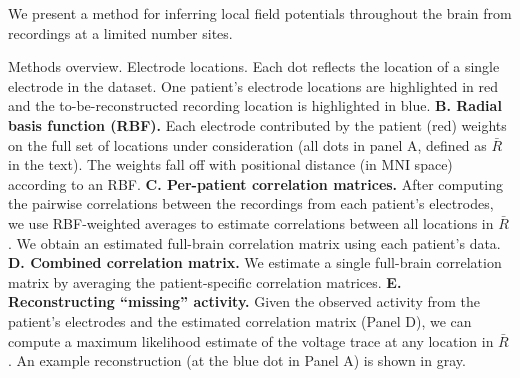 
We present a method for inferring local field potentials throughout the brain from recordings at a limited number sites.

Methods overview. Electrode
      locations.  Each dot reflects the location of a single
    electrode in the dataset.  One patient's electrode locations are
    highlighted in red and the to-be-reconstructed recording location
    is highlighted in blue. \textbf{B. Radial basis function (RBF).}
    Each electrode contributed by the patient (red) weights on the
    full set of locations under consideration (all dots in panel A,
    defined as $\bar{R}$ in the text).  The weights fall off with
    positional distance (in MNI space) according to an RBF.
    \textbf{C. Per-patient correlation matrices.}  After computing the
    pairwise correlations between the recordings from each patient's
    electrodes, we use RBF-weighted averages to estimate correlations
    between all locations in $\bar{R}$.  We obtain an estimated
    full-brain correlation matrix using each patient's
    data. \textbf{D.  Combined correlation matrix.}  We estimate a
    single full-brain correlation matrix by averaging
    the patient-specific correlation matrices.  \textbf{E.
      Reconstructing ``missing'' activity.}  Given the observed
    activity from the patient's electrodes and the estimated
    correlation matrix (Panel D), we can compute a maximum likelihood
    estimate of the voltage trace at any location in $\bar{R}$.  An
    example reconstruction (at the blue dot in Panel A) is shown in
    gray.


